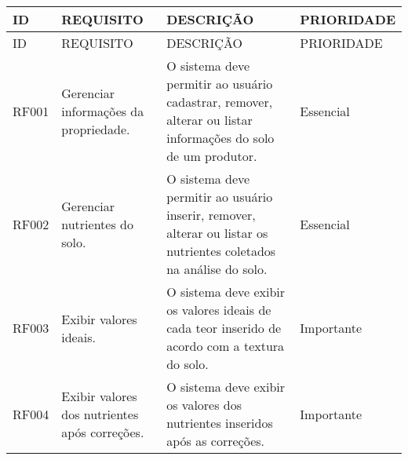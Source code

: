 \begin{landscape}
\begin{longtable}{|p{1.5cm}|p{5cm}|p{9cm}|p{2.5cm}|}
    \hline
    ID    & REQUISITO                                                                        & DESCRIÇÃO                                                                                                                                                                                                                                                                                               & PRIORIDADE \\\hline
    \endfirsthead
    \hline
    ID    & REQUISITO                                                                        & DESCRIÇÃO                                                                                                                                                                                                                                                                                               & PRIORIDADE \\\hline
    \endhead
    RF001 & Gerenciar informações da propriedade.                                            & O sistema deve permitir ao usuário cadastrar, remover, alterar ou listar informações do solo de um produtor.                                                                                                                                                                                            & Essencial  \\\hline
    RF002 & Gerenciar nutrientes do solo.                                                    & O sistema deve permitir ao usuário inserir, remover, alterar ou listar os nutrientes coletados na análise do solo.                                                                                                                                                                                      & Essencial  \\\hline
    RF003 & Exibir valores ideais.                                                           & O sistema deve exibir os valores ideais de cada teor inserido de acordo com a textura do solo.                                                                                                                                                                                                          & Importante \\\hline
    RF004 & Exibir valores dos nutrientes após correções.                                    & O sistema deve exibir os valores dos nutrientes inseridos após as correções.                                                                                                                                                                                                                            & Importante \\\hline

\end{longtable}
\end{landscape}
